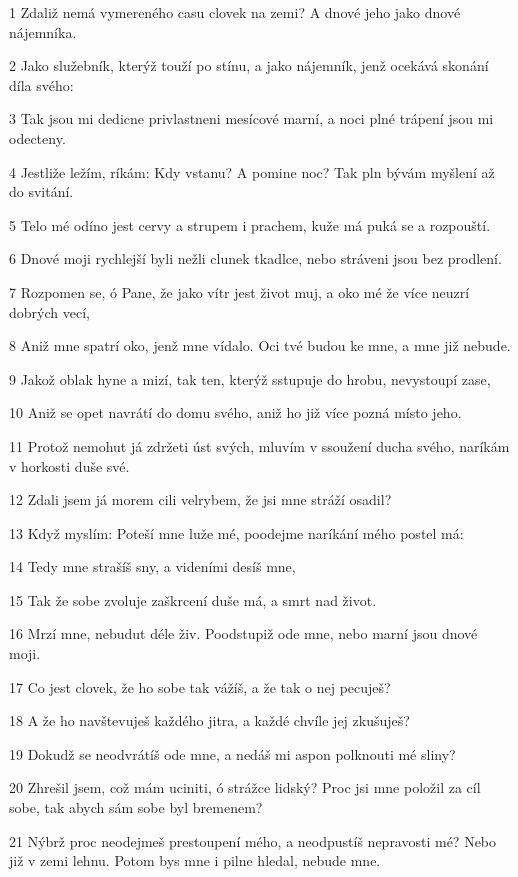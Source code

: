 \par 1 Zdaliž nemá vymereného casu clovek na zemi? A dnové jeho jako dnové nájemníka.
\par 2 Jako služebník, kterýž touží po stínu, a jako nájemník, jenž ocekává skonání díla svého:
\par 3 Tak jsou mi dedicne privlastneni mesícové marní, a noci plné trápení jsou mi odecteny.
\par 4 Jestliže ležím, ríkám: Kdy vstanu? A  pomine noc? Tak pln bývám myšlení až do svitání.
\par 5 Telo mé odíno jest cervy a strupem i prachem, kuže má puká se a rozpouští.
\par 6 Dnové moji rychlejší byli nežli clunek tkadlce, nebo stráveni jsou bez prodlení.
\par 7 Rozpomen se, ó Pane, že jako vítr jest život muj, a oko mé že více neuzrí dobrých vecí,
\par 8 Aniž mne spatrí oko, jenž mne vídalo. Oci tvé budou ke mne, a mne již nebude.
\par 9 Jakož oblak hyne a mizí, tak ten, kterýž sstupuje do hrobu, nevystoupí zase,
\par 10 Aniž se opet navrátí do domu svého, aniž ho již více pozná místo jeho.
\par 11 Protož nemohut já zdržeti úst svých, mluvím v ssoužení ducha svého, naríkám v horkosti duše své.
\par 12 Zdali jsem já morem cili velrybem, že jsi mne stráží osadil?
\par 13 Když myslím: Poteší mne luže mé, poodejme naríkání mého postel má:
\par 14 Tedy mne strašíš sny, a videními desíš mne,
\par 15 Tak že sobe zvoluje zaškrcení duše má, a smrt nad život.
\par 16 Mrzí mne, nebudut déle živ. Poodstupiž ode mne, nebo marní jsou dnové moji.
\par 17 Co jest clovek, že ho sobe tak vážíš, a že tak o nej pecuješ?
\par 18 A že ho navštevuješ každého jitra, a každé chvíle jej zkušuješ?
\par 19 Dokudž se neodvrátíš ode mne, a nedáš mi aspon polknouti mé sliny?
\par 20 Zhrešil jsem, což mám uciniti, ó strážce lidský? Proc jsi mne položil za cíl sobe, tak abych sám sobe byl bremenem?
\par 21 Nýbrž proc neodejmeš prestoupení mého, a neodpustíš nepravosti mé? Nebo již v zemi lehnu. Potom bys mne i pilne hledal, nebude mne.

